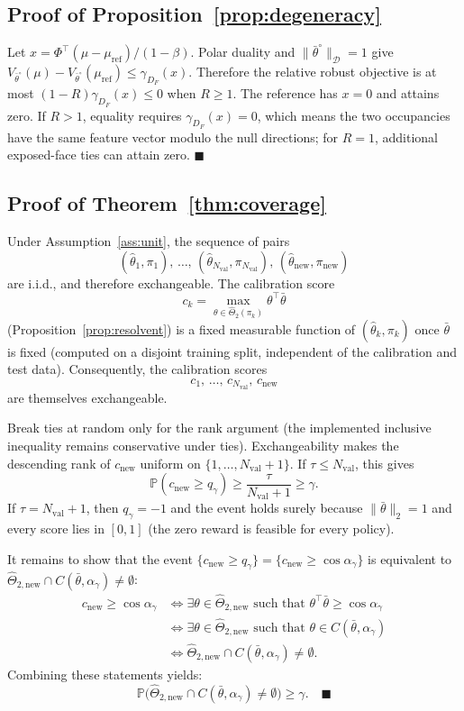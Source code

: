 \documentclass{article}
\newcommand{\Dnorm}[1]{\|#1\|_{\mathcal D}}
\begin{document}
\subsection{Proof of Proposition~\ref{prop:degeneracy}}

Let $x=\Phi^\top(\mu-\mu_{\mathrm{ref}})/(1-\beta)$. Polar duality and
$\Dnorm{\bar\theta^\circ}=1$ give
$V_{\bar\theta^\circ}(\mu)-V_{\bar\theta^\circ}(\mu_{\mathrm{ref}})
\le\gamma_{D_F}(x)$. Therefore the relative robust objective is at most
$(1-R)\gamma_{D_F}(x)\le0$ when $R\ge1$. The reference has $x=0$ and attains
zero. If $R>1$, equality requires $\gamma_{D_F}(x)=0$, which means the two
occupancies have the same feature vector modulo the null directions; for
$R=1$, additional exposed-face ties can attain zero. $\blacksquare$

\subsection{Proof of Theorem~\ref{thm:coverage}}
\label{app:proof-coverage}

Under Assumption~\ref{ass:unit}, the sequence of pairs
\[
(\hat\theta_1,\pi_1),\,\dots,\,(\hat\theta_{N_{\mathrm{val}}},\pi_{N_{\mathrm{val}}}),\,(\hat\theta_{\mathrm{new}},\pi_{\mathrm{new}})
\]
are i.i.d., and therefore exchangeable. The calibration score
\[
c_k = \max_{\theta\in\hat\Theta_2(\pi_k)}\theta^\top\bar\theta
\]
(Proposition~\ref{prop:resolvent}) is a fixed measurable function of $(\hat\theta_k,\pi_k)$ once $\bar\theta$ is fixed (computed on a disjoint training split, independent of the calibration and test data). Consequently, the calibration scores
\[
c_1,\,\dots,\,c_{N_{\mathrm{val}}},\,c_{\mathrm{new}}
\]
are themselves exchangeable.

Break ties at random only for the rank argument (the implemented inclusive
inequality remains conservative under ties). Exchangeability makes the
descending rank of $c_{\mathrm{new}}$ uniform on
$\{1,\dots,N_{\mathrm{val}}+1\}$. If $\tau\le N_{\mathrm{val}}$, this gives
\[
\mathbb{P}(c_{\mathrm{new}} \geq q_\gamma)
\geq \frac{\tau}{N_{\mathrm{val}}+1} \geq \gamma.
\]
If $\tau=N_{\mathrm{val}}+1$, then $q_\gamma=-1$ and the event holds surely
because $\|\bar\theta\|_2=1$ and every score lies in $[0,1]$ (the zero reward
is feasible for every policy).

It remains to show that the event
$\{c_{\mathrm{new}} \geq q_\gamma\} =
\{c_{\mathrm{new}} \geq \cos\alpha_\gamma\}$ is equivalent to
$\hat\Theta_{2,\mathrm{new}} \cap C(\bar\theta,\alpha_\gamma) \neq \emptyset$:
\begin{align*}
c_{\mathrm{new}} \geq \cos\alpha_\gamma &\iff \exists \theta \in \hat\Theta_{2,\mathrm{new}} \text{ such that } \theta^\top\bar\theta \geq \cos\alpha_\gamma \\
&\iff \exists \theta \in \hat\Theta_{2,\mathrm{new}} \text{ such that } \theta \in C(\bar\theta,\alpha_\gamma) \\
&\iff \hat\Theta_{2,\mathrm{new}} \cap C(\bar\theta,\alpha_\gamma) \neq \emptyset.
\end{align*}
Combining these statements yields:
\[
\mathbb{P}\big(\hat\Theta_{2,\mathrm{new}} \cap C(\bar\theta,\alpha_\gamma) \neq \emptyset\big) \geq \gamma. \quad \blacksquare
\]
\end{document}
